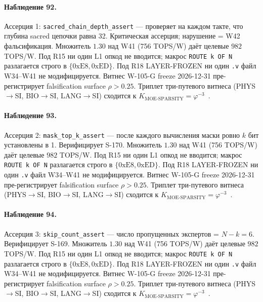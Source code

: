 \paragraph{Наблюдение 92.} Ассерция 1: \texttt{sacred\_chain\_depth\_assert} --- проверяет на каждом такте, что глубина sacred цепочки равна 32. Критическая ассерция; нарушение = W42 фальсификация. Множитель $1{.}30$ над W41 (756 TOPS/W) даёт целевые $982$ TOPS/W. Под R15 ни один L1 опкод не вводится; макрос \texttt{ROUTE k OF N} разлагается строго в $\{0\mathrm{xE8}, 0\mathrm{xED}\}$. Под R18 LAYER-FROZEN ни один \texttt{.v} файл W34--W41 не модифицируется. Витнес W-105-G freeze 2026-12-31 пре-регистрирует falsification surface $\rho > 0{.}25$. Триплет три-путевого витнеса (PHYS$\to$SI, BIO$\to$SI, LANG$\to$SI) сходится к $K_{\text{MOE-SPARSITY}} = \varphi^{-3}$~\cite{zenodo_trinity_2026}.

\paragraph{Наблюдение 93.} Ассерция 2: \texttt{mask\_top\_k\_assert} --- после каждого вычисления маски ровно $k$ бит установлены в 1. Верифицирует S-170. Множитель $1{.}30$ над W41 (756 TOPS/W) даёт целевые $982$ TOPS/W. Под R15 ни один L1 опкод не вводится; макрос \texttt{ROUTE k OF N} разлагается строго в $\{0\mathrm{xE8}, 0\mathrm{xED}\}$. Под R18 LAYER-FROZEN ни один \texttt{.v} файл W34--W41 не модифицируется. Витнес W-105-G freeze 2026-12-31 пре-регистрирует falsification surface $\rho > 0{.}25$. Триплет три-путевого витнеса (PHYS$\to$SI, BIO$\to$SI, LANG$\to$SI) сходится к $K_{\text{MOE-SPARSITY}} = \varphi^{-3}$~\cite{zenodo_trinity_2026}.

\paragraph{Наблюдение 94.} Ассерция 3: \texttt{skip\_count\_assert} --- число пропущенных экспертов = $N - k = 6$. Верифицирует S-169. Множитель $1{.}30$ над W41 (756 TOPS/W) даёт целевые $982$ TOPS/W. Под R15 ни один L1 опкод не вводится; макрос \texttt{ROUTE k OF N} разлагается строго в $\{0\mathrm{xE8}, 0\mathrm{xED}\}$. Под R18 LAYER-FROZEN ни один \texttt{.v} файл W34--W41 не модифицируется. Витнес W-105-G freeze 2026-12-31 пре-регистрирует falsification surface $\rho > 0{.}25$. Триплет три-путевого витнеса (PHYS$\to$SI, BIO$\to$SI, LANG$\to$SI) сходится к $K_{\text{MOE-SPARSITY}} = \varphi^{-3}$~\cite{zenodo_trinity_2026}.

